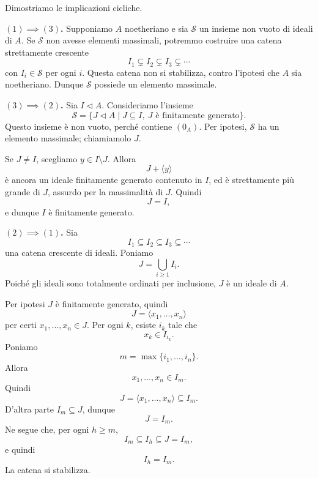 \documentclass[a4paper]{article}
\begin{document}
\begin{radioactive}
\begin{snippetproof}{}
    Dimostriamo le implicazioni cicliche.

    \textbf{\((1)\implies (3)\).}
    Supponiamo \(A\) noetheriano e sia \(\mathcal{S}\) un insieme non vuoto di ideali di \(A\).
    Se \(\mathcal{S}\) non avesse elementi massimali, potremmo costruire una catena strettamente crescente
    \[
        I_1\subsetneq I_2\subsetneq I_3\subsetneq\cdots
    \]
    con \(I_i\in\mathcal{S}\) per ogni \(i\).
    Questa catena non si stabilizza, contro l'ipotesi che \(A\) sia noetheriano.
    Dunque \(\mathcal{S}\) possiede un elemento massimale.

    \textbf{\((3)\implies (2)\).}
    Sia \(I\triangleleft A\). Consideriamo l'insieme
    \[
        \mathcal{S}
        =
        \{J\triangleleft A\mid J\subseteq I,\ J \text{ è finitamente generato}\}.
    \]
    Questo insieme è non vuoto, perché contiene \((0_A)\).
    Per ipotesi, \(\mathcal{S}\) ha un elemento massimale; chiamiamolo \(J\).

    Se \(J\neq I\), scegliamo \(y\in I\setminus J\). Allora
    \[
        J+\langle y \rangle
    \]
    è ancora un ideale finitamente generato contenuto in \(I\), ed è strettamente più grande di \(J\), assurdo per la massimalità di \(J\).
    Quindi
    \[
        J=I,
    \]
    e dunque \(I\) è finitamente generato.

    \textbf{\((2)\implies (1)\).}
    Sia
    \[
        I_1\subseteq I_2\subseteq I_3\subseteq\cdots
    \]
    una catena crescente di ideali. Poniamo
    \[
        J=\bigcup_{i\geq 1} I_i.
    \]
    Poiché gli ideali sono totalmente ordinati per inclusione, \(J\) è un ideale di \(A\).

    Per ipotesi \(J\) è finitamente generato, quindi
    \[
        J=\langle x_1,\ldots,x_n \rangle
    \]
    per certi \(x_1,\ldots,x_n\in J\).
    Per ogni \(k\), esiste \(i_k\) tale che
    \[
        x_k\in I_{i_k}.
    \]
    Poniamo
    \[
        m=\max\{i_1,\ldots,i_n\}.
    \]
    Allora
    \[
        x_1,\ldots,x_n\in I_m.
    \]
    Quindi
    \[
        J=\langle x_1,\ldots,x_n \rangle\subseteq I_m.
    \]
    D'altra parte \(I_m\subseteq J\), dunque
    \[
        J=I_m.
    \]
    Ne segue che, per ogni \(h\geq m\),
    \[
        I_m\subseteq I_h\subseteq J=I_m,
    \]
    e quindi
    \[
        I_h=I_m.
    \]
    La catena si stabilizza.
\end{snippetproof}
\end{radioactive}
\end{document}

